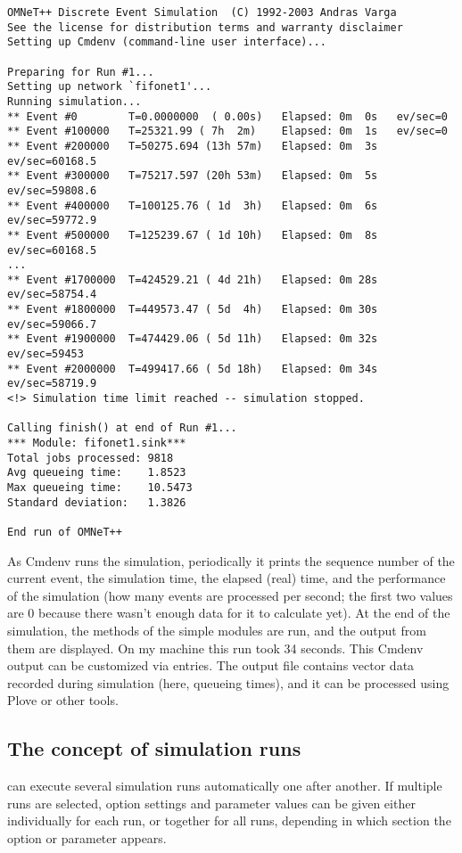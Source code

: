 \begin{verbatim}
OMNeT++ Discrete Event Simulation  (C) 1992-2003 Andras Varga
See the license for distribution terms and warranty disclaimer
Setting up Cmdenv (command-line user interface)...

Preparing for Run #1...
Setting up network `fifonet1'...
Running simulation...
** Event #0        T=0.0000000  ( 0.00s)   Elapsed: 0m  0s   ev/sec=0
** Event #100000   T=25321.99 ( 7h  2m)    Elapsed: 0m  1s   ev/sec=0
** Event #200000   T=50275.694 (13h 57m)   Elapsed: 0m  3s   ev/sec=60168.5
** Event #300000   T=75217.597 (20h 53m)   Elapsed: 0m  5s   ev/sec=59808.6
** Event #400000   T=100125.76 ( 1d  3h)   Elapsed: 0m  6s   ev/sec=59772.9
** Event #500000   T=125239.67 ( 1d 10h)   Elapsed: 0m  8s   ev/sec=60168.5
...
** Event #1700000  T=424529.21 ( 4d 21h)   Elapsed: 0m 28s   ev/sec=58754.4
** Event #1800000  T=449573.47 ( 5d  4h)   Elapsed: 0m 30s   ev/sec=59066.7
** Event #1900000  T=474429.06 ( 5d 11h)   Elapsed: 0m 32s   ev/sec=59453
** Event #2000000  T=499417.66 ( 5d 18h)   Elapsed: 0m 34s   ev/sec=58719.9
<!> Simulation time limit reached -- simulation stopped.

Calling finish() at end of Run #1...
*** Module: fifonet1.sink***
Total jobs processed: 9818
Avg queueing time:    1.8523
Max queueing time:    10.5473
Standard deviation:   1.3826

End run of OMNeT++
\end{verbatim}

As Cmdenv runs the simulation, periodically it prints the sequence number
of the current event, the simulation time, the elapsed (real) time,
and the performance of the simulation (how many events are processed per
second; the first two values are 0 because there wasn't enough data
for it to calculate yet). At the end of the simulation, the 
methods of the simple modules are run, and the output from them are displayed.
On my machine this run took 34 seconds. This Cmdenv output can be
customized via  entries. The output file 
contains vector data recorded during simulation (here, queueing times),
and it can be processed using Plove or other tools.

\subsection{The concept of simulation runs}

{\opp} can execute several simulation runs automatically one after
another. If multiple runs are
selected, option settings and parameter values can be given either
individually for each run, or together for all runs, depending in
which section the option or parameter appears.

